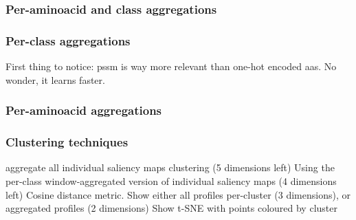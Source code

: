 			\subsubsection*{Per-aminoacid and class aggregations}
			
			\subsubsection*{Per-class aggregations}
			First thing to notice: pssm is way more relevant than one-hot encoded aas. No wonder, it learns faster.
	
			\subsubsection*{Per-aminoacid aggregations}
	
		\subsubsection{Clustering techniques}
		aggregate all individual saliency maps %
		clustering (5 dimensions left)
		Using the per-class window-aggregated version of individual saliency maps (4 dimensions left)
		Cosine distance metric.
		Show either all profiles per-cluster (3 dimensions), or aggregated profiles (2 dimensions)
		Show t-SNE with points coloured by cluster
